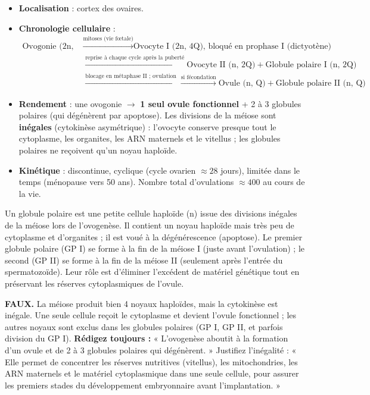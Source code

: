 \documentclass[11pt]{article}
\newcommand{\cle}[1]{{\popxbold\color{popdark}#1}}
\begin{document}
\begin{propriete}
\begin{itemize}
    \item \textbf{Localisation} : cortex des ovaires.
    \item \textbf{Chronologie cellulaire} :
    \begin{align*}
    \text{Ovogonie (2n, 2Q)} &\xrightarrow{\text{mitoses (vie fœtale)}} \text{Ovocyte I (2n, 4Q), bloqué en prophase I (dictyotène)} \\
    &\xrightarrow{\text{reprise à chaque cycle après la puberté}} \text{Ovocyte II (n, 2Q)} + \text{Globule polaire I (n, 2Q)} \\
    &\xrightarrow{\text{blocage en métaphase II ; ovulation}} \xrightarrow{\text{si fécondation}} \text{Ovule (n, Q)} + \text{Globule polaire II (n, Q)}
    \end{align*}
    \item \textbf{Rendement} : une ovogonie $\rightarrow$ \textbf{1 seul ovule fonctionnel} + 2 à 3 globules polaires (qui dégénèrent par apoptose). Les divisions de la méiose sont \textbf{inégales} (cytokinèse asymétrique) : l'ovocyte conserve presque tout le cytoplasme, les organites, les ARN maternels et le vitellus ; les globules polaires ne reçoivent qu'un noyau haploïde.
    \item \textbf{Kinétique} : discontinue, cyclique (cycle ovarien $\approx 28$ jours), limitée dans le temps (ménopause vers 50 ans). Nombre total d'ovulations $\approx 400$ au cours de la vie.
\end{itemize}
\end{propriete}

\begin{definition}
Un \cle{globule polaire} est une petite cellule haploïde (n) issue des divisions inégales de la méiose lors de l'ovogenèse. Il contient un noyau haploïde mais très peu de cytoplasme et d'organites ; il est voué à la dégénérescence (apoptose). Le premier globule polaire (GP I) se forme à la fin de la méiose I (juste avant l'ovulation) ; le second (GP II) se forme à la fin de la méiose II (seulement après l'entrée du spermatozoïde). Leur rôle est d'éliminer l'excédent de matériel génétique tout en préservant les réserves cytoplasmiques de l'ovule.
\end{definition}

\begin{attention}
\textbf{FAUX.} La méiose produit bien 4 noyaux haploïdes, mais la cytokinèse est inégale. Une seule cellule reçoit le cytoplasme et devient l'ovule fonctionnel ; les autres noyaux sont exclus dans les globules polaires (GP I, GP II, et parfois division du GP I). \textbf{Rédigez toujours :} « L'ovogenèse aboutit à la formation d'un ovule et de 2 à 3 globules polaires qui dégénèrent. » Justifiez l'inégalité : « Elle permet de concentrer les réserves nutritives (vitellus), les mitochondries, les ARN maternels et le matériel cytoplasmique dans une seule cellule, pour assurer les premiers stades du développement embryonnaire avant l'implantation. »
\end{attention}
\end{document}
